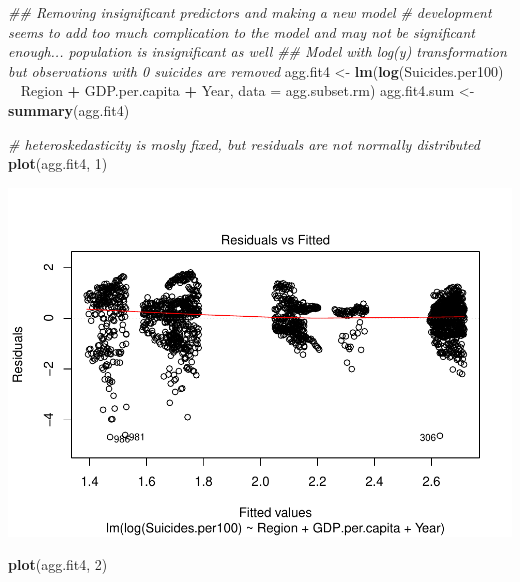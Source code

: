 \documentclass[11pt,]{article}
\newenvironment{Shaded}{\begin{snugshade}}{\end{snugshade}}
\newcommand{\CommentTok}[1]{\textcolor[rgb]{0.56,0.35,0.01}{\textit{#1}}}
\newcommand{\DataTypeTok}[1]{\textcolor[rgb]{0.13,0.29,0.53}{#1}}
\newcommand{\DecValTok}[1]{\textcolor[rgb]{0.00,0.00,0.81}{#1}}
\newcommand{\KeywordTok}[1]{\textcolor[rgb]{0.13,0.29,0.53}{\textbf{#1}}}
\newcommand{\NormalTok}[1]{#1}
\newcommand{\OperatorTok}[1]{\textcolor[rgb]{0.81,0.36,0.00}{\textbf{#1}}}
\newcommand{\StringTok}[1]{\textcolor[rgb]{0.31,0.60,0.02}{#1}}
\begin{document}
\begin{Shaded}
\begin{Highlighting}[]
\CommentTok{## Removing insignificant predictors and making a new model}
\CommentTok{# development seems to add too much complication to the model and may not be significant enough... population is insignificant as well}
\CommentTok{## Model with log(y) transformation but observations with 0 suicides are removed}
\NormalTok{agg.fit4 <-}\StringTok{ }\KeywordTok{lm}\NormalTok{(}\KeywordTok{log}\NormalTok{(Suicides.per100) }\OperatorTok{~}\StringTok{ }\NormalTok{Region }\OperatorTok{+}\StringTok{ }\NormalTok{GDP.per.capita }\OperatorTok{+}\StringTok{ }\NormalTok{Year, }\DataTypeTok{data =}\NormalTok{ agg.subset.rm)}
\NormalTok{agg.fit4.sum <-}\StringTok{ }\KeywordTok{summary}\NormalTok{(agg.fit4)}

\CommentTok{# heteroskedasticity is mosly fixed, but residuals are not normally distributed}
\KeywordTok{plot}\NormalTok{(agg.fit4, }\DecValTok{1}\NormalTok{)}
\end{Highlighting}
\end{Shaded}

\includegraphics{An-Analysis-of-Suicide-Data_files/figure-latex/unnamed-chunk-7-1.pdf}

\begin{Shaded}
\begin{Highlighting}[]
\KeywordTok{plot}\NormalTok{(agg.fit4, }\DecValTok{2}\NormalTok{)}
\end{Highlighting}
\end{Shaded}
\end{document}
